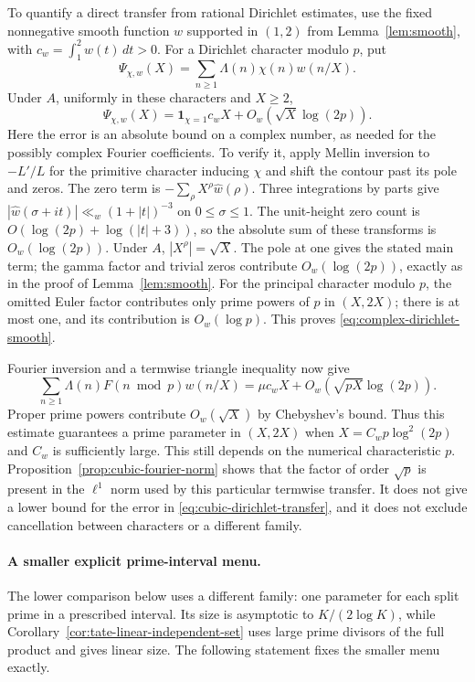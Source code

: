 \documentclass[11pt]{article}
\theoremstyle{definition}
\theoremstyle{remark}
\begin{document}
To quantify a direct transfer from rational Dirichlet estimates, use the
fixed nonnegative smooth function $w$ supported in $(1,2)$ from
Lemma~\ref{lem:smooth}, with $c_w=\int_1^2w(t)\,dt>0$.
For a Dirichlet character modulo $p$, put
\[
 \Psi_{\chi,w}(X)=\sum_{n\ge1}\Lambda(n)\chi(n)w(n/X).
\]
Under $A$, uniformly in these characters and $X\ge2$,
\begin{equation}\label{eq:complex-dirichlet-smooth}
 \Psi_{\chi,w}(X)=\boldsymbol1_{\chi=1}c_wX
       +O_w\!\left(\sqrt X\log(2p)\right).
\end{equation}
Here the error is an absolute bound on a complex number, as needed
for the possibly complex Fourier coefficients. To verify it, apply
Mellin inversion to $-L'/L$ for the primitive character inducing
$\chi$ and shift the contour past its pole and zeros. The zero term is
$-\sum_\rho X^\rho\widehat w(\rho)$. Three integrations by parts
give $|\widehat w(\sigma+it)|\ll_w(1+|t|)^{-3}$ on
$0\le\sigma\le1$. The unit-height zero count is
$O(\log(2p)+\log(|t|+3))$, so the absolute sum of these transforms
is $O_w(\log(2p))$. Under $A$, $|X^\rho|=\sqrt X$.
The pole at one gives the stated main term; the gamma factor and
trivial zeros contribute $O_w(\log(2p))$, exactly as in the proof
of Lemma~\ref{lem:smooth}. For the principal character modulo $p$,
the omitted Euler factor contributes only prime powers of $p$ in
$(X,2X)$; there is at most one, and its contribution is
$O_w(\log p)$. This proves \eqref{eq:complex-dirichlet-smooth}.

Fourier inversion and a termwise triangle inequality now give
\begin{equation}\label{eq:cubic-dirichlet-transfer}
 \sum_{n\ge1}\Lambda(n)F(n\bmod p)w(n/X)
   =\mu c_wX+O_w\!\left(\sqrt{pX}\log(2p)\right).
\end{equation}
Proper prime powers contribute $O_w(\sqrt X)$ by Chebyshev's
bound. Thus this estimate guarantees a prime parameter in $(X,2X)$
when $X=C_w p\log^2(2p)$ and $C_w$ is sufficiently large.
This still depends on the numerical characteristic $p$.
Proposition~\ref{prop:cubic-fourier-norm} shows that the factor
of order $\sqrt p$ is present in the $\ell^1$ norm used by this
particular termwise transfer. It does not give a lower bound for
the error in \eqref{eq:cubic-dirichlet-transfer}, and it does not
exclude cancellation between characters or a different family.


\paragraph{A smaller explicit prime-interval menu.}
The lower comparison below uses a different family: one parameter for
each split prime in a prescribed interval.  Its size is asymptotic to
$K/(2\log K)$, while Corollary~\ref{cor:tate-linear-independent-set}
uses large prime divisors of the full product and gives linear size.
The following statement fixes the smaller menu exactly.
\end{document}
